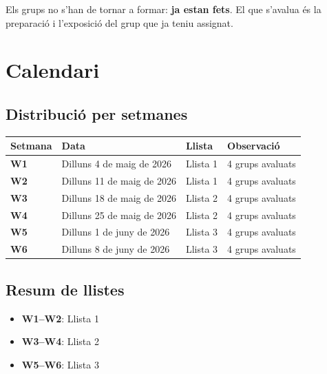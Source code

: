 \documentclass[12pt,a4paper]{report}
\begin{document}
\begin{tcolorbox}[colback=softyellow,colframe=upcblue,title=Recordatori]
Els grups no s'han de tornar a formar: \textbf{ja estan fets}. El que s'avalua
és la preparació i l'exposició del grup que ja teniu assignat.
\end{tcolorbox}

\chapter{Calendari}

\section{Distribució per setmanes}

\begin{center}
\begin{tabularx}{\textwidth}{>{\bfseries}l l l Y}
\toprule
Setmana & Data & Llista & Observació \\
\midrule
W1 & Dilluns 4 de maig de 2026 & Llista 1 & 4 grups avaluats \\
W2 & Dilluns 11 de maig de 2026 & Llista 1 & 4 grups avaluats \\
W3 & Dilluns 18 de maig de 2026 & Llista 2 & 4 grups avaluats \\
W4 & Dilluns 25 de maig de 2026 & Llista 2 & 4 grups avaluats \\
W5 & Dilluns 1 de juny de 2026 & Llista 3 & 4 grups avaluats \\
W6 & Dilluns 8 de juny de 2026 & Llista 3 & 4 grups avaluats \\
\bottomrule
\end{tabularx}
\end{center}

\section{Resum de llistes}

\begin{tcolorbox}[colback=softgray,colframe=black,title=Assignació]
\begin{itemize}
  \item \textbf{W1--W2}: Llista 1
  \item \textbf{W3--W4}: Llista 2
  \item \textbf{W5--W6}: Llista 3
\end{itemize}
\end{tcolorbox}
\end{document}
